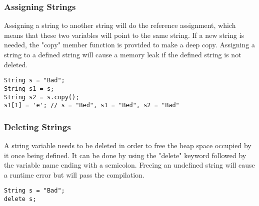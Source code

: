 \subsubsection{Assigning Strings}
Assigning a string to another string will do the reference assignment, which means that these two variables will point to the same string. If a new string is needed, the "copy" member function is provided to make a deep copy. Assigning a string to a defined string will cause a memory leak if the defined string is not deleted.
\begin{lstlisting}[caption={assigning\_string.csm}, captionpos=b]
String s = "Bad";
String s1 = s;
String s2 = s.copy();
s1[1] = 'e'; // s = "Bed", s1 = "Bed", s2 = "Bad"
\end{lstlisting}
\subsubsection{Deleting Strings}
A string variable needs to be deleted in order to free the heap space occupied by it once being defined. It can be done by using the "delete" keyword followed by the variable name ending with a semicolon. Freeing an undefined string will cause a runtime error but will pass the compilation.
\begin{lstlisting}[caption={deleting\_string.csm}, captionpos=b]
String s = "Bad";
delete s;
\end{lstlisting}
